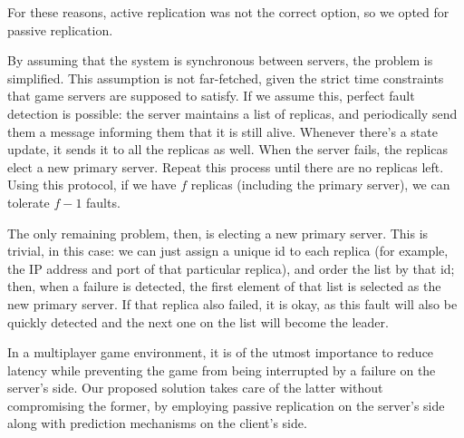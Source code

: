 \documentclass[times, 10pt,twocolumn]{article}
\begin{document}
For these reasons, active replication was not the correct option, so we opted
for passive replication.

By assuming that the system is synchronous between servers, the problem is
simplified. This assumption is not far-fetched, given the strict time constraints
that game servers are supposed to satisfy. If we assume this, perfect fault
detection is possible: the server maintains a list of replicas, and periodically
send them a message informing them that it is still alive. Whenever there's a
state update, it sends it to all the replicas as well. When the server fails, the
replicas elect a new primary server. Repeat this process until there are no
replicas left. Using this protocol, if we have $f$ replicas (including the
primary server), we can tolerate \(f - 1\) faults.

The only remaining problem, then, is electing a new primary server. This is
trivial, in this case: we can just assign a unique id to each replica (for
example, the IP address and port of that particular replica), and
order the list by that id; then, when a failure is detected, the first
element of that list is selected as the new primary server. If that replica
also failed, it is okay, as this fault will also be quickly detected and the
next one on the list will become the leader.

In a multiplayer game environment, it is of the utmost importance to
reduce latency while preventing the game from being interrupted by a
failure on the server's side. Our proposed solution takes care of the
latter without compromising the former, by employing passive replication
on the server's side along with prediction mechanisms on the client's
side.


\end{document}
